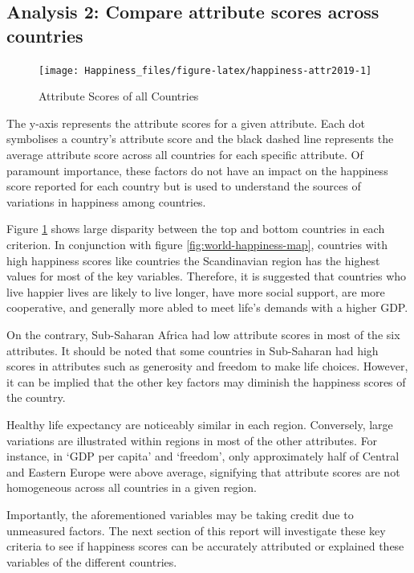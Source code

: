 \documentclass[11pt,a4paper,]{article}
\begin{document}
\clearpage

\hypertarget{analysis-2-compare-attribute-scores-across-countries}{%
\subsection{Analysis 2: Compare attribute scores across countries}\label{analysis-2-compare-attribute-scores-across-countries}}

\begin{figure}

{\centering \texttt{[image: Happiness\_files/figure-latex/happiness-attr2019-1]} 

}

\caption{Attribute Scores of all Countries}\label{fig:happiness-attr2019}
\end{figure}

The y-axis represents the attribute scores for a given attribute. Each dot symbolises a country's attribute score and the black dashed line represents the average attribute score across all countries for each specific attribute. Of paramount importance, these factors do not have an impact on the happiness score reported for each country but is used to understand the sources of variations in happiness among countries.

Figure \ref{fig:happiness-attr2019} shows large disparity between the top and bottom countries in each criterion. In conjunction with figure \ref{fig:world-happiness-map}, countries with high happiness scores like countries the Scandinavian region has the highest values for most of the key variables. Therefore, it is suggested that countries who live happier lives are likely to live longer, have more social support, are more cooperative, and generally more abled to meet life's demands with a higher GDP.

On the contrary, Sub-Saharan Africa had low attribute scores in most of the six attributes. It should be noted that some countries in Sub-Saharan had high scores in attributes such as generosity and freedom to make life choices. However, it can be implied that the other key factors may diminish the happiness scores of the country.

Healthy life expectancy are noticeably similar in each region. Conversely, large variations are illustrated within regions in most of the other attributes. For instance, in `GDP per capita' and `freedom', only approximately half of Central and Eastern Europe were above average, signifying that attribute scores are not homogeneous across all countries in a given region.

Importantly, the aforementioned variables may be taking credit due to unmeasured factors. The next section of this report will investigate these key criteria to see if happiness scores can be accurately attributed or explained these variables of the different countries.

\clearpage

\printbibliography
\end{document}
